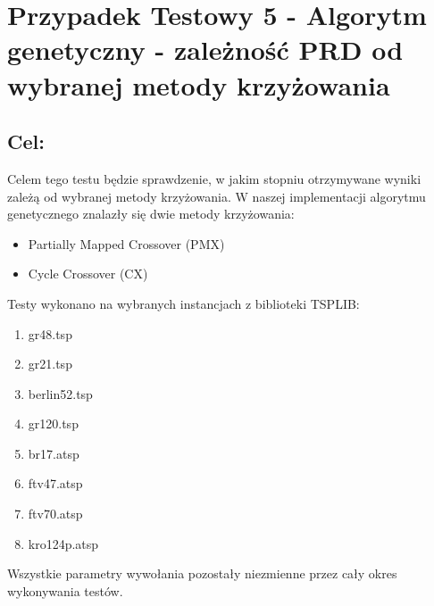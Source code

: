 \section{Przypadek Testowy 5 - Algorytm genetyczny - zależność PRD od wybranej metody krzyżowania}
  \subsection{Cel:}
    Celem tego testu będzie sprawdzenie, w jakim stopniu otrzymywane wyniki zależą od wybranej metody krzyżowania. W naszej implementacji
    algorytmu genetycznego znalazły się dwie metody krzyżowania:
    \begin{itemize}
      \item Partially Mapped Crossover (PMX)
      \item Cycle Crossover (CX)
    \end{itemize}
    Testy wykonano na wybranych instancjach z biblioteki TSPLIB:
    \begin{enumerate}
      \item gr48.tsp
      \item gr21.tsp
      \item berlin52.tsp
      \item gr120.tsp
      \item br17.atsp
      \item ftv47.atsp
      \item ftv70.atsp
      \item kro124p.atsp 
    \end{enumerate}
    Wszystkie parametry wywołania pozostały niezmienne przez cały okres wykonywania testów.
